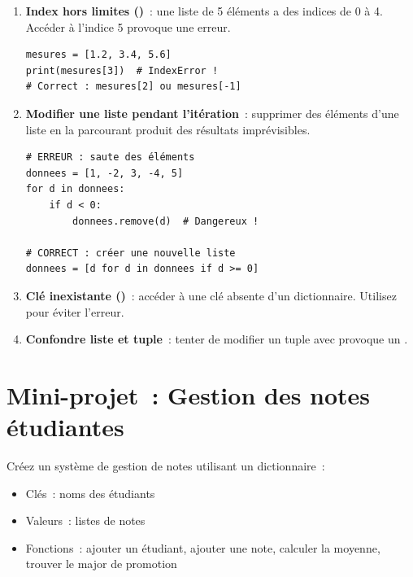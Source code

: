 \begin{errmark}
\begin{enumerate}
    \item \textbf{Index hors limites ()}~: une liste de 5 \'el\'ements a
    des indices de 0 \`a 4. Acc\'eder \`a l'indice 5 provoque une erreur.
    \begin{verbatim}
mesures = [1.2, 3.4, 5.6]
print(mesures[3])  # IndexError !
# Correct : mesures[2] ou mesures[-1]
    \end{verbatim}

    \item \textbf{Modifier une liste pendant l'it\'eration}~: supprimer des \'el\'ements
    d'une liste en la parcourant produit des r\'esultats impr\'evisibles.
    \begin{verbatim}
# ERREUR : saute des éléments
donnees = [1, -2, 3, -4, 5]
for d in donnees:
    if d < 0:
        donnees.remove(d)  # Dangereux !

# CORRECT : créer une nouvelle liste
donnees = [d for d in donnees if d >= 0]
    \end{verbatim}

    \item \textbf{Cl\'e inexistante ()}~: acc\'eder \`a une cl\'e absente d'un
    dictionnaire. Utilisez  pour \'eviter l'erreur.

    \item \textbf{Confondre liste et tuple}~: tenter de modifier un tuple avec
     provoque un .
\end{enumerate}
\end{errmark}

\section{Mini-projet~: Gestion des notes \'etudiantes}

\begin{projet}
Cr\'eez un syst\`eme de gestion de notes utilisant un dictionnaire~:
\begin{itemize}
    \item Cl\'es~: noms des \'etudiants
    \item Valeurs~: listes de notes
    \item Fonctions~: ajouter un \'etudiant, ajouter une note, calculer la moyenne,
          trouver le major de promotion
\end{itemize}
\end{projet}

